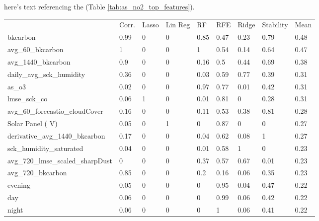 here's text referencing the (Table \ref{tab:as_no2_top_features}).

\begin{table}[H]
\centering
\begin{tabular}{lllllllll}
\\
\\
\toprule
     & Corr. & Lasso & Lin Reg & RF   & RFE  & Ridge & Stability & Mean \\
\midrule
bkcarbon                          & 0.99  & 0     & 0          & 0.85 & 0.47 & 0.23  & 0.79      & 0.48 \\
avg\_60\_bkcarbon                 & 1     & 0     & 0          & 1    & 0.54 & 0.14  & 0.64      & 0.47 \\
avg\_1440\_bkcarbon               & 0.9   & 0     & 0          & 0.16 & 0.5  & 0.44  & 0.69      & 0.38 \\
daily\_avg\_sck\_humidity         & 0.36  & 0     & 0          & 0.03 & 0.59 & 0.77  & 0.39      & 0.31 \\
as\_o3                            & 0.02  & 0     & 0          & 0.97 & 0.77 & 0.01  & 0.42      & 0.31 \\
lmse\_sck\_co                     & 0.06  & 1     & 0          & 0.01 & 0.81 & 0     & 0.28      & 0.31 \\
avg\_60\_forecastio\_cloudCover   & 0.16  & 0     & 0          & 0.11 & 0.53 & 0.38  & 0.81      & 0.28 \\
Solar Panel ( V)                  & 0.05  & 0     & 1          & 0    & 0.87 & 0     & 0         & 0.27 \\
derivative\_avg\_1440\_bkcarbon   & 0.17  & 0     & 0          & 0.04 & 0.62 & 0.08  & 1         & 0.27 \\
sck\_humidity\_saturated          & 0.04  & 0     & 0          & 0.01 & 0.58 & 1     & 0         & 0.23 \\
avg\_720\_lmse\_scaled\_sharpDust & 0     & 0     & 0          & 0.37 & 0.57 & 0.67  & 0.01      & 0.23 \\
avg\_720\_bkcarbon                & 0.85  & 0     & 0          & 0.2  & 0.16 & 0.06  & 0.35      & 0.23 \\
evening                           & 0.05  & 0     & 0          & 0    & 0.95 & 0.04  & 0.47      & 0.22 \\
day                               & 0.06  & 0     & 0          & 0    & 0.99 & 0.06  & 0.42      & 0.22 \\
night                             & 0.06  & 0     & 0          & 0    & 1    & 0.06  & 0.41      & 0.22 \\

\end{tabular}
\end{table}
